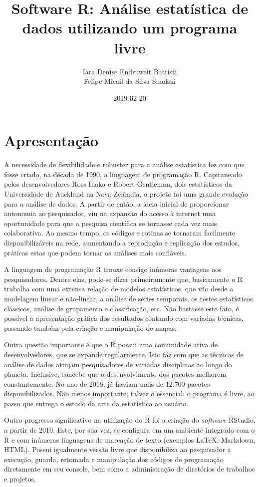 \documentclass[12pt,brazil,oneside]{book}
\title{Software R: Análise estatística de dados utilizando um programa livre}
\author{Iara Denise Endruweit Battisti \\ Felipe Micail da Silva Smolski}
\date{2019-02-20}
\begin{document}
\maketitle

{
\setcounter{tocdepth}{1}
\tableofcontents
}
\hypertarget{apresentacao}{%
\chapter*{Apresentação}\label{apresentacao}}

A necessidade de flexibilidade e robustez para a análise estatística fez com que fosse criado, na década de 1990, a linguagem de programação R. Capitaneado pelos desenvolvedores Ross Ihaka e Robert Gentleman, dois estatísticos da Universidade de Auckland na Nova Zelândia, o projeto foi uma grande evolução para a análise de dados. A partir de então, a ideia inicial de proporcionar autonomia ao pesquisador, viu na expansão do acesso à internet uma oportunidade para que a pesquisa científica se tornasse cada vez mais colaborativa. Ao mesmo tempo, os códigos e rotinas se tornaram facilmente disponibilizáveis na rede, aumentando a reprodução e replicação dos estudos, práticas estas que podem tornar as análises mais confiáveis.

A linguagem de programação R trouxe consigo inúmeras vantagens aos pesquisadores. Dentre elas, pode-se dizer primeiramente que, basicamente o R trabalha com uma extensa relação de modelos estatísticos, que vão desde a modelagem linear e não-linear, a análise de séries temporais, os testes estatísticos clássicos, análise de grupamento e classificação, etc. Não bastasse este fato, é possível a apresentação gráfica dos resultados contando com variadas técnicas, passando também pela criação e manipulação de mapas.

Outra questão importante é que o R possui uma comunidade ativa de desenvolvedores, que se expande regularmente. Isto faz com que as técnicas de análise de dados atinjam pesquisadores de variadas disciplinas ao longo do planeta. Inclusive, concebe que o desenvolvimento dos pacotes melhorem constantemente. No ano de 2018, já haviam mais de 12.700 pacotes disponibilizados. Não menos importante, talvez o essencial: o programa é livre, ao passo que entrega o estado da arte da estatística ao usuário.

Outro progresso significativo na utilização do R foi a criação do \emph{software} RStudio, a partir de 2010. Este, por sua vez, se configura em um ambiente integrado com o R e com inúmeras linguagens de marcação de texto (exemplos LaTeX, Markdown, HTML). Possui igualmente versão livre que disponibiliza ao pesquisador a execução, guarda, retomada e manipulação dos códigos de programação diretamente em seu console, bem como a administração de diretórios de trabalhos e projetos.
\end{document}
